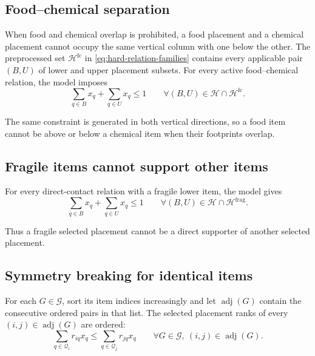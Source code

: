 \documentclass[11pt]{article}
\newcommand{\Place}{\mathcal{Q}}
\begin{document}
\subsection{Food--chemical separation}

When food and chemical overlap is prohibited, a food placement and a chemical
placement cannot occupy the same vertical column with one below the other.
The preprocessed set $\mathcal H^{\mathrm{fc}}$ in
\eqref{eq:hard-relation-families} contains every applicable pair $(B,U)$ of
lower and upper placement subsets.  For every active food--chemical relation,
the model imposes
\begin{equation}
  \sum_{q\in B}x_q + \sum_{q\in U}x_q \le 1
  \qquad \forall(B,U)\in\mathcal H\cap\mathcal H^{\mathrm{fc}}.
  \label{eq:food-chemical}
\end{equation}

The same constraint is generated in both vertical directions, so a food item
cannot be above or below a chemical item when their footprints overlap.

\subsection{Fragile items cannot support other items}

For every direct-contact relation with a fragile lower item, the model gives
\begin{equation}
  \sum_{q\in B}x_q
  +\sum_{q\in U}x_q \le 1
  \qquad \forall(B,U)\in\mathcal H\cap\mathcal H^{\mathrm{frag}}.
  \label{eq:fragile}
\end{equation}

Thus a fragile selected placement cannot be a direct supporter of another
selected placement.

\subsection{Symmetry breaking for identical items}

For each $G\in\mathcal G$, sort its item indices increasingly and let
$\operatorname{adj}(G)$ contain the consecutive ordered pairs in that list.
The selected placement ranks of every $(i,j)\in\operatorname{adj}(G)$ are
ordered:
\begin{equation}
  \sum_{q\in\Place_i}r_{iq}x_q
  \le \sum_{q\in\Place_j}r_{jq}x_q
  \qquad \forall G\in\mathcal G,\ (i,j)\in\operatorname{adj}(G).
  \label{eq:symmetry}
\end{equation}
\end{document}
